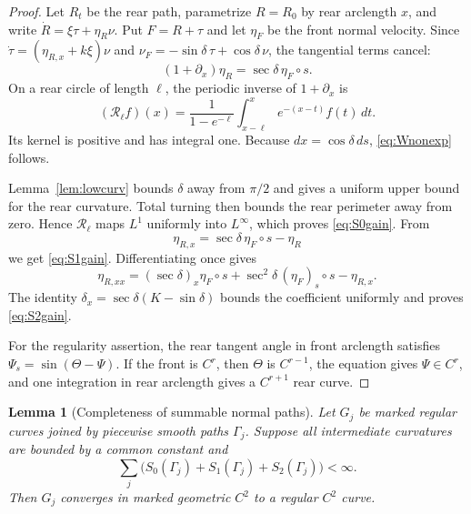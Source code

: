 \documentclass[11pt]{article}
\newtheorem{lemma}[theorem]{Lemma}
\theoremstyle{remark}
\begin{document}
\begin{proof}
Let $R_t$ be the rear path, parametrize $R=R_0$ by rear arclength $x$, and
write
$\dot R=\xi\tau+\eta_R\nu$.  Put $F=R+\tau$ and let $\eta_F$ be the front
normal velocity.  Since
$\dot\tau=(\eta_{R,x}+k\xi)\nu$ and
$\nu_F=-\sin\delta\,\tau+\cos\delta\,\nu$, the tangential terms cancel:
\begin{equation}\label{eq:inverse-jacobi}
  (1+\partial_x)\eta_R
  =\sec\delta\,\eta_F\circ s.
\end{equation}
On a rear circle of length $\ell$, the periodic inverse of
$1+\partial_x$ is
\[
  (\mathcal R_\ell f)(x)
  =\frac{1}{1-e^{-\ell}}
    \int_{x-\ell}^x e^{-(x-t)}f(t)\,dt.
\]
Its kernel is positive and has integral one.  Because
$dx=\cos\delta\,ds$, \eqref{eq:Wnonexp} follows.

Lemma~\ref{lem:lowcurv} bounds \(\delta\) away from \(\pi/2\) and gives a
uniform upper bound for the rear curvature.  Total turning then bounds the rear
perimeter away from zero.  Hence \(\mathcal R_\ell\) maps \(L^1\) uniformly
into \(L^\infty\), which proves \eqref{eq:S0gain}.  From
\[
  \eta_{R,x}=\sec\delta\,\eta_F\circ s-\eta_R
\]
we get \eqref{eq:S1gain}.  Differentiating once gives
\[
  \eta_{R,xx}
  =(\sec\delta)_x\eta_F\circ s
   +\sec^2\delta\,(\eta_F)_s\circ s
   -\eta_{R,x}.
\]
The identity
\(\delta_x=\sec\delta(K-\sin\delta)\) bounds the coefficient uniformly and
proves \eqref{eq:S2gain}.

For the regularity assertion, the rear tangent angle in front arclength satisfies
$\Psi_s=\sin(\Theta-\Psi)$.  If the front is $C^r$, then $\Theta$ is
$C^{r-1}$, the equation gives $\Psi\in C^r$, and one integration in rear
arclength gives a $C^{r+1}$ rear curve.
\end{proof}

\begin{lemma}[Completeness of summable normal paths]\label{lem:complete}
Let \(G_j\) be marked regular curves joined by piecewise smooth paths \(\Gamma_j\).
Suppose all intermediate curvatures are bounded by a common constant and
\[
   \sum_j\bigl(S_0(\Gamma_j)+S_1(\Gamma_j)+S_2(\Gamma_j)\bigr)<\infty.
\]
Then \(G_j\) converges in marked geometric \(C^2\) to a regular \(C^2\)
curve.
\end{lemma}
\end{document}

